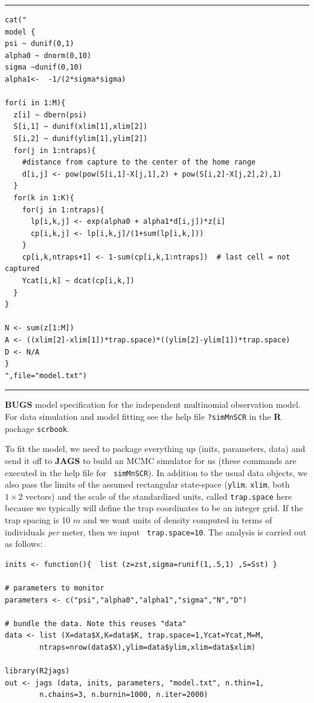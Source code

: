 \begin{panel}[htp]
\centering
\rule[0.15in]{\textwidth}{.03in}
{\small
\begin{verbatim}
cat("
model {
psi ~ dunif(0,1)
alpha0 ~ dnorm(0,10)
sigma ~dunif(0,10)
alpha1<-  -1/(2*sigma*sigma)

for(i in 1:M){
  z[i] ~ dbern(psi)
  S[i,1] ~ dunif(xlim[1],xlim[2])
  S[i,2] ~ dunif(ylim[1],ylim[2])
  for(j in 1:ntraps){
    #distance from capture to the center of the home range
    d[i,j] <- pow(pow(S[i,1]-X[j,1],2) + pow(S[i,2]-X[j,2],2),1)
  }
  for(k in 1:K){
    for(j in 1:ntraps){
      lp[i,k,j] <- exp(alpha0 + alpha1*d[i,j])*z[i]
      cp[i,k,j] <- lp[i,k,j]/(1+sum(lp[i,k,]))
    }
    cp[i,k,ntraps+1] <- 1-sum(cp[i,k,1:ntraps])  # last cell = not captured
    Ycat[i,k] ~ dcat(cp[i,k,])
  }
}

N <- sum(z[1:M])
A <- ((xlim[2]-xlim[1])*trap.space)*((ylim[2]-ylim[1])*trap.space)
D <- N/A
}
",file="model.txt")

\end{verbatim}
}
\rule[-0.15in]{\textwidth}{.03in}
\caption{
{\bf BUGS} model specification for the independent multinomial
observation model. For data simulation and model fitting see the
help file \mbox{\tt ?simMnSCR} in the {\bf R} package \mbox{\tt scrbook}.
}
\label{poisson-mn.panel.mn}
\end{panel}

To fit the model, we need to package everything up (inits, parameters,
data) and send it off to \mbox{\bf JAGS} to build an MCMC simulator
for us (these commands are executed in the help file for \mbox{\tt
  simMnSCR}). In addition to the usual data objects, we also pass
the limits of the assumed rectangular state-space (\mbox{\tt ylim},
\mbox{\tt xlim}, both $1 \times 2$ vectors) and the scale of the
standardized units, called \mbox{\tt trap.space} here because we
typically will define the trap coordinates to be an integer grid. If
the trap spacing is 10 $m$ and we want units of density computed in
terms of individuals {\it per} meter, then we input \mbox{\tt
  trap.space=10}. The analysis is carried out as follows:
\begin{samepage}
{\small
\begin{verbatim}
inits <- function(){  list (z=zst,sigma=runif(1,.5,1) ,S=Sst) }

# parameters to monitor
parameters <- c("psi","alpha0","alpha1","sigma","N","D")

# bundle the data. Note this reuses "data"
data <- list (X=data$X,K=data$K, trap.space=1,Ycat=Ycat,M=M,
        ntraps=nrow(data$X),ylim=data$ylim,xlim=data$xlim)

library(R2jags)
out <- jags (data, inits, parameters, "model.txt", n.thin=1,
        n.chains=3, n.burnin=1000, n.iter=2000)
\end{verbatim}
}
\end{samepage}

